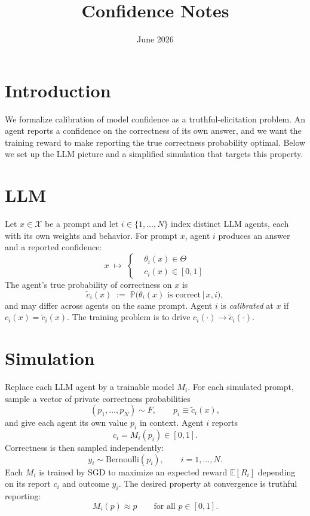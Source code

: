 \documentclass{article}
\title{Confidence Notes}
\date{June 2026}
\begin{document}
\maketitle

\section{Introduction}
We formalize calibration of model confidence as a truthful-elicitation problem. An agent reports a confidence on the correctness of its own answer, and we want the training reward to make reporting the true correctness probability optimal. Below we set up the LLM picture and a simplified simulation that targets this property.

\section{LLM}
Let $x \in \mathcal{X}$ be a prompt and let $i \in \{1, \ldots, N\}$ index distinct LLM agents, each with its own weights and behavior. For prompt $x$, agent $i$ produces an answer and a reported confidence:
\[
x \;\longmapsto\; \left\{ \begin{aligned} &\theta_i(x) \in \Theta \\ &c_i(x) \in [0,1] \end{aligned} \right.
\]
The agent's true probability of correctness on $x$ is
\[
\tilde{c}_i(x) \;:=\; \mathbb{P}\!\big(\theta_i(x) \text{ is correct} \,\big|\, x, i\big),
\]
and may differ across agents on the same prompt. Agent $i$ is \emph{calibrated} at $x$ if $c_i(x) = \tilde{c}_i(x)$. The training problem is to drive $c_i(\cdot) \to \tilde{c}_i(\cdot)$.

\section{Simulation}
Replace each LLM agent by a trainable model $M_i$. For each simulated prompt, sample a vector of private correctness probabilities
\[
(p_1, \ldots, p_N) \sim F, \qquad p_i \equiv \tilde{c}_i(x),
\]
and give each agent its own value $p_i$ in context. Agent $i$ reports
\[
c_i = M_i(p_i) \in [0,1].
\]
Correctness is then sampled independently:
\[
y_i \sim \mathrm{Bernoulli}(p_i), \qquad i = 1, \ldots, N.
\]
Each $M_i$ is trained by SGD to maximize an expected reward $\mathbb{E}[R_i]$ depending on its report $c_i$ and outcome $y_i$. The desired property at convergence is truthful reporting:
\[
M_i(p) \approx p \qquad \text{for all } p \in [0,1].
\]
\end{document}
